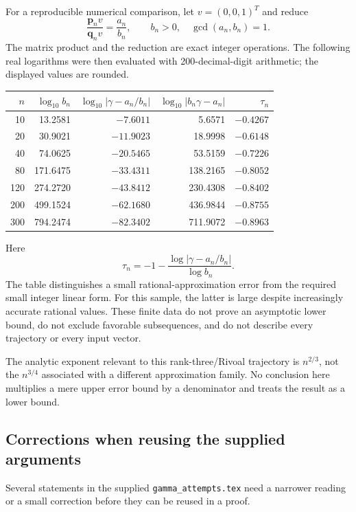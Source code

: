 \documentclass[11pt,a4paper]{article}
\theoremstyle{definition}
\theoremstyle{remark}
\numberwithin{equation}{section}
\begin{document}
For a reproducible numerical comparison, let $v=(0,0,1)^T$ and reduce
\[
 \frac{\mathbf p_nv}{\mathbf q_nv}=\frac{a_n}{b_n},
 \qquad b_n>0,\quad \gcd(a_n,b_n)=1.
\]
The matrix product and the reduction are exact integer operations.
The following real logarithms were then evaluated with 200-decimal-digit
arithmetic; the displayed values are rounded.
\begin{center}
\small
\begin{tabular}{@{}rrrrr@{}}
\toprule
$n$ & $\log_{10}b_n$ &
$\log_{10}|\gamma-a_n/b_n|$ &
$\log_{10}|b_n\gamma-a_n|$ & $\tau_n$\\
\midrule
10  & 13.2581  & $-7.6011$  & 5.6571   & $-0.4267$\\
20  & 30.9021  & $-11.9023$ & 18.9998  & $-0.6148$\\
40  & 74.0625  & $-20.5465$ & 53.5159  & $-0.7226$\\
80  & 171.6475 & $-33.4311$ & 138.2165 & $-0.8052$\\
120 & 274.2720 & $-43.8412$ & 230.4308 & $-0.8402$\\
200 & 499.1524 & $-62.1680$ & 436.9844 & $-0.8755$\\
300 & 794.2474 & $-82.3402$ & 711.9072 & $-0.8963$\\
\bottomrule
\end{tabular}
\end{center}
Here
\[
 \tau_n=-1-
 \frac{\log|\gamma-a_n/b_n|}{\log b_n}.
\]
The table distinguishes a small rational-approximation error from the
required small integer linear form. For this sample, the latter is
large despite increasingly accurate rational values. These finite data
do not prove an asymptotic lower bound, do not exclude favorable
subsequences, and do not describe every trajectory or every input vector.

The analytic exponent relevant to this rank-three/Rivoal trajectory is
$n^{2/3}$, not the $n^{3/4}$ associated with a different approximation
family. No conclusion here multiplies a mere upper error bound by a
denominator and treats the result as a lower bound.

\subsection{Corrections when reusing the supplied arguments}

Several statements in the supplied \texttt{gamma\_attempts.tex} need a
narrower reading or a small correction before they can be reused in a
proof.
\end{document}
